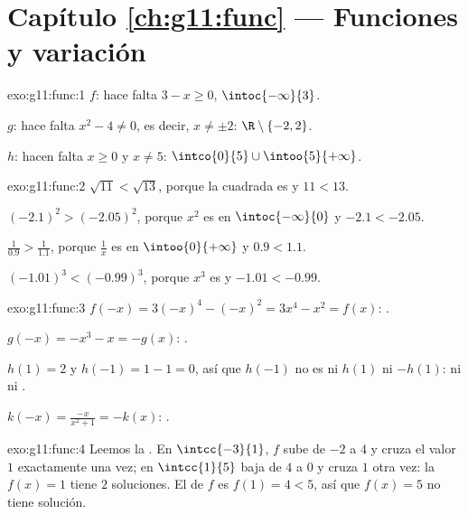 \section*{Capítulo \ref{ch:g11:func} --- Funciones y variación}

\begin{solution}{exo:g11:func:1}
$f$: hace falta $3 - x \geq 0$,  $\intoc{-\infty}{3}$.

$g$: hace falta $x^2 - 4 \neq 0$, es decir, $x \neq \pm 2$: 
$\R \setminus \{-2, 2\}$.

$h$: hacen falta $x \geq 0$ y $x \neq 5$: 
$\intco{0}{5} \cup \intoo{5}{+\infty}$.
\end{solution}

\begin{solution}{exo:g11:func:2}
$\sqrt{11} < \sqrt{13}$, porque la  cuadrada es  y
$11 < 13$.

$(-2.1)^2 > (-2.05)^2$, porque $x^2$ es  en
$\intoc{-\infty}{0}$ y $-2.1 < -2.05$.

$\frac{1}{0.9} > \frac{1}{1.1}$, porque $\frac1x$ es  en
$\intoo{0}{+\infty}$ y $0.9 < 1.1$.

$(-1.01)^3 < (-0.99)^3$, porque $x^3$ es  y $-1.01 < -0.99$.
\end{solution}

\begin{solution}{exo:g11:func:3}
$f(-x) = 3(-x)^4 - (-x)^2 = 3x^4 - x^2 = f(x)$: .

$g(-x) = -x^3 - x = -g(x)$: .

$h(1) = 2$ y $h(-1) = 1 - 1 = 0$, así que $h(-1)$ no es ni $h(1)$ ni
$-h(1)$: ni  ni .

$k(-x) = \frac{-x}{x^2+1} = -k(x)$: .
\end{solution}

\begin{solution}{exo:g11:func:4}
Leemos la . En $\intcc{-3}{1}$, $f$ sube de $-2$ a $4$ y
cruza el valor $1$ exactamente una vez; en $\intcc{1}{5}$ baja de $4$ a
$0$ y cruza $1$ otra vez: la  $f(x) = 1$ tiene $2$ soluciones. El
 de $f$ es $f(1) = 4 < 5$, así que $f(x) = 5$ no tiene solución.
\end{solution}

